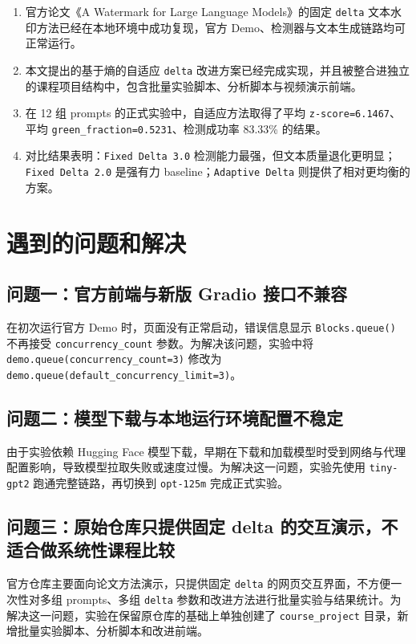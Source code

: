 \documentclass{SYSUReport}
\begin{document}
\begin{enumerate}
    \item 官方论文《A Watermark for Large Language Models》的固定 \texttt{delta} 文本水印方法已经在本地环境中成功复现，官方 Demo、检测器与文本生成链路均可正常运行。
    \item 本文提出的基于熵的自适应 \texttt{delta} 改进方案已经完成实现，并且被整合进独立的课程项目结构中，包含批量实验脚本、分析脚本与视频演示前端。
    \item 在 12 组 prompts 的正式实验中，自适应方法取得了平均 \texttt{z-score=6.1467}、平均 \texttt{green\_fraction=0.5231}、检测成功率 83.33\% 的结果。
    \item 对比结果表明：\texttt{Fixed Delta 3.0} 检测能力最强，但文本质量退化更明显；\texttt{Fixed Delta 2.0} 是强有力 baseline；\texttt{Adaptive Delta} 则提供了相对更均衡的方案。
\end{enumerate}

\section{遇到的问题和解决}

\subsection{问题一：官方前端与新版 Gradio 接口不兼容}

在初次运行官方 Demo 时，页面没有正常启动，错误信息显示 \texttt{Blocks.queue()} 不再接受 \texttt{concurrency\_count} 参数。为解决该问题，实验中将 \texttt{demo.queue(concurrency\_count=3)} 修改为 \texttt{demo.queue(default\_concurrency\_limit=3)}。

\subsection{问题二：模型下载与本地运行环境配置不稳定}

由于实验依赖 Hugging Face 模型下载，早期在下载和加载模型时受到网络与代理配置影响，导致模型拉取失败或速度过慢。为解决这一问题，实验先使用 \texttt{tiny-gpt2} 跑通完整链路，再切换到 \texttt{opt-125m} 完成正式实验。

\subsection{问题三：原始仓库只提供固定 delta 的交互演示，不适合做系统性课程比较}

官方仓库主要面向论文方法演示，只提供固定 \texttt{delta} 的网页交互界面，不方便一次性对多组 prompts、多组 \texttt{delta} 参数和改进方法进行批量实验与结果统计。为解决这一问题，实验在保留原仓库的基础上单独创建了 \texttt{course\_project} 目录，新增批量实验脚本、分析脚本和改进前端。
\end{document}

